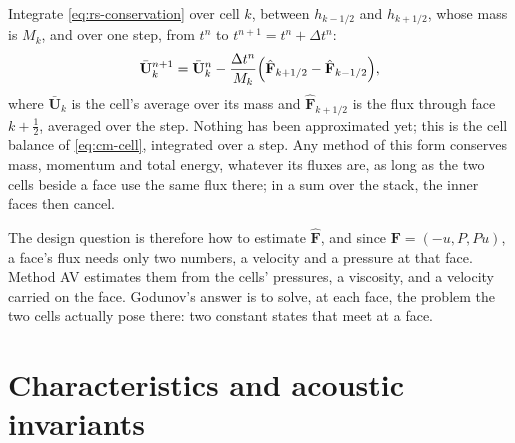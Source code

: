 Integrate \cref{eq:rs-conservation} over cell $k$, between $h_{k-1/2}$ and
$h_{k+1/2}$, whose mass is $M_k$, and over one step, from $t^n$ to
$t^{n+1} = t^n + \Delta t^n$:
\begin{equation}
\bar{\mathbf{U}}^{n+1}_k = \bar{\mathbf{U}}^n_k
  - \frac{\Delta t^n}{M_k}\Bigl(\hat{\mathbf{F}}_{k+1/2} - \hat{\mathbf{F}}_{k-1/2}\Bigr),
\label{eq:rs-finite-volume}
\end{equation}
where $\bar{\mathbf{U}}_k$ is the cell's average over its mass and
$\hat{\mathbf{F}}_{k+1/2}$ is the flux through face $k + \tfrac{1}{2}$,
averaged over the step. Nothing has been approximated yet; this is the cell
balance of \cref{eq:cm-cell}, integrated over a step. Any method of this
form conserves mass, momentum and total energy, whatever its fluxes are, as
long as the two cells beside a face use the same flux there; in a sum over
the stack, the inner faces then cancel.

The design question is therefore how to estimate $\hat{\mathbf{F}}$, and
since $\mathbf{F} = (-u, P, Pu)$, a face's flux needs only two numbers, a
velocity and a pressure at that face. Method AV estimates them from the
cells' pressures, a viscosity, and a velocity carried on the face.
Godunov's answer is to solve, at each face, the problem the two cells
actually pose there: two constant states that meet at a face.

\section{Characteristics and acoustic invariants}
\label{sec:rs-characteristics}


